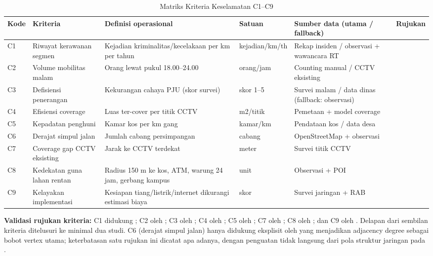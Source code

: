 \documentclass[conference]{IEEEtran}
\begin{document}
\begin{table}[!t]
\caption{Matriks Kriteria Keselamatan C1--C9}
\label{tab:kriteria}
\setlength{\tabcolsep}{4pt}
\centering
\small
\begin{tabular}{p{0.7cm}p{2.2cm}p{3.8cm}p{1.4cm}p{3.8cm}p{2.9cm}}
\toprule
\textbf{Kode} & \textbf{Kriteria} & \textbf{Definisi operasional} & \textbf{Satuan} & \textbf{Sumber data (utama / fallback)} & \textbf{Rujukan} \\
\midrule
C1 & Riwayat kerawanan segmen & Kejadian kriminalitas/kecelakaan per km per tahun & kejadian/km/th & Rekap insiden / observasi + wawancara RT & \cite{kanj2024,baddour2026,almassawa2024,feizizadeh2025} \\
C2 & Volume mobilitas malam & Orang lewat pukul 18.00--24.00 & orang/jam & Counting manual / CCTV eksisting & \cite{feizizadeh2025,kabashkin2025,almassawa2024} \\
C3 & Defisiensi penerangan & Kekurangan cahaya PJU (skor survei) & skor 1--5 & Survei malam / data dinas (fallback: observasi) & \cite{baddour2026,zheng2025} \\
C4 & Efisiensi coverage & Luas ter-cover per titik CCTV & m2/titik & Pemetaan + model coverage & \cite{wang2025,yuhang2025} \\
C5 & Kepadatan penghuni & Kamar kos per km gang & kamar/km & Pendataan kos / data desa & \cite{yuhang2025,feizizadeh2025,choi2025} \\
C6 & Derajat simpul jalan & Jumlah cabang persimpangan & cabang & OpenStreetMap + observasi & \cite{wang2025} \\
C7 & Coverage gap CCTV eksisting & Jarak ke CCTV terdekat & meter & Survei titik CCTV & \cite{wang2025,yuhang2025} \\
C8 & Kedekatan guna lahan rentan & Radius 150 m ke kos, ATM, warung 24 jam, gerbang kampus & unit & Observasi + POI & \cite{feizizadeh2025,baddour2026,ahmed2022} \\
C9 & Kelayakan implementasi & Kesiapan tiang/listrik/internet dikurangi estimasi biaya & skor & Survei jaringan + RAB & \cite{kanj2024,wang2025,baddour2026} \\
\bottomrule
\end{tabular}
\end{table}

\textbf{Validasi rujukan kriteria:} C1 didukung \cite{kanj2024,baddour2026,almassawa2024}; C2 oleh \cite{feizizadeh2025,kabashkin2025,almassawa2024}; C3 oleh \cite{baddour2026,zheng2025}; C4 oleh \cite{wang2025,yuhang2025}; C5 oleh \cite{yuhang2025,feizizadeh2025,choi2025}; C7 oleh \cite{wang2025,yuhang2025}; C8 oleh \cite{feizizadeh2025,baddour2026,ahmed2022}; dan C9 oleh \cite{kanj2024,wang2025,baddour2026}. Delapan dari sembilan kriteria ditelusuri ke minimal dua studi. C6 (derajat simpul jalan) hanya didukung eksplisit oleh \cite{wang2025} yang menjadikan adjacency degree sebagai bobot vertex utama; keterbatasan satu rujukan ini dicatat apa adanya, dengan penguatan tidak langsung dari pola struktur jaringan pada \cite{yuhang2025}.
\end{document}
